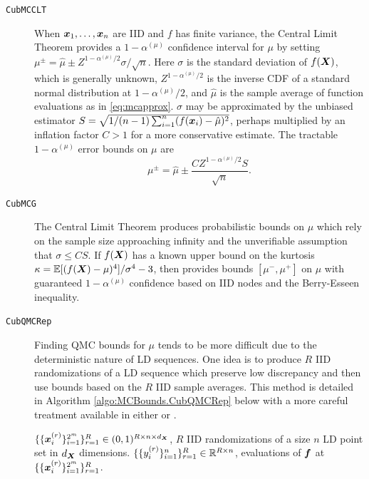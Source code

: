 \documentclass{article}[12pt]
\begin{document}
\begin{description}
    \item[\texttt{CubMCCLT}] When $\bx_1,\dots,\bx_n$ are IID and $f$ has finite variance, the Central Limit Theorem provides a $1-\alpha^{(\mu)}$ confidence interval for $\mu$ by setting $\mu^\pm = \hat{\mu} \pm Z^{1-\alpha^{(\mu)}/2}\sigma/\sqrt{n}$. Here $\sigma$ is the standard deviation of $f(\bX)$, which is generally unknown, $Z^{1-\alpha^{(\mu)}/2}$ is the inverse CDF of a standard normal distribution at $1-\alpha^{(\mu)}/2$, and $\hat{\mu}$ is the sample average of function evaluations as in \eqref{eq:mcapprox}. $\sigma$ may be approximated by the unbiased estimator $S = \sqrt{1/(n-1)\sum_{i=1}^n(f(\bx_i)-\hat{\mu})^2}$, perhaps multiplied by an inflation factor $C>1$ for a more conservative estimate. The tractable $1-\alpha^{(\mu)}$ error bounds on $\mu$ are
    \begin{equation*}
        \mu^\pm = \hat{\mu} \pm \frac{CZ^{1-\alpha^{(\mu)}/2}S}{\sqrt{n}}
        \label{eq:clt_mu_bounds}.
    \end{equation*}
    \item[\texttt{CubMCG}] The Central Limit Theorem produces probabilistic bounds on $\mu$ which rely on the sample size approaching infinity and the unverifiable assumption that $\sigma \leq CS$. If $f(\bX)$ has a known upper bound on the kurtosis $\kappa = \bbE[(f(\bX)-\mu)^4]/\sigma^4-3$, then   \cite{cubmcg} provides bounds $[\mu^-,\mu^+]$ on $\mu$ with guaranteed $1-\alpha^{(\mu)}$ confidence based on IID nodes and the Berry-Esseen inequality.
    \item[\texttt{CubQMCRep}] Finding QMC bounds for $\mu$ tends to be more difficult due to the deterministic nature of LD sequences. One idea is to produce $R$ IID randomizations of a LD sequence which preserve low discrepancy and then use bounds based on the $R$ IID sample averages. This method is detailed in Algorithm \ref{algo:MCBounds.CubQMCRep} below with a more careful treatment available in either \cite[Chapter 17]{mcbook} or \cite{qmc4pde_preprint}. \begin{algorithm}[h!]
        \caption{$\texttt{MCBounds.CubQMCRep}\left(\{\{\bx_i^{(r)}\}_{i=1}^n\}_{r=1}^R, \{\{y_i^{(r)}\}_{i=1}^n\}_{r=1}^R, \alpha^{(\mu)}\right)$}
        \label{algo:MCBounds.CubQMCRep}
        \begin{algorithmic}
        \Require $\{\{\bx_i^{(r)}\}_{i=1}^{2^m}\}_{r=1}^R \in (0,1)^{R \times n \times d_{\bX}}$, $R$ IID randomizations of a size $n$ LD point set in $d_{\bX}$ dimensions.
        \Require $\{\{y_i^{(r)}\}_{i=1}^n\}_{r=1}^R \in \bbR^{R \times n}$, evaluations of $\bf$ at $\{\{\bx_i^{(r)}\}_{i=1}^{2^m}\}_{r=1}^R$.

\end{algorithmic}
\end{algorithm}
\end{description}
\end{document}
